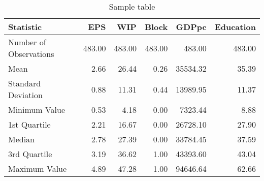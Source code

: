 \documentclass{article}
\begin{document}
\begin{table}
\centering
\begin{tabular}{lrrrrr}
\toprule
             Statistic &    EPS &    WIP &  Block &    GDPpc &  Education \\
\midrule
Number of Observations & 483.00 & 483.00 & 483.00 &   483.00 &     483.00 \\
                  Mean &   2.66 &  26.44 &   0.26 & 35534.32 &      35.39 \\
    Standard Deviation &   0.88 &  11.31 &   0.44 & 13989.95 &      11.37 \\
         Minimum Value &   0.53 &   4.18 &   0.00 &  7323.44 &       8.88 \\
          1st Quartile &   2.21 &  16.67 &   0.00 & 26728.10 &      27.90 \\
                Median &   2.78 &  27.39 &   0.00 & 33784.45 &      37.59 \\
          3rd Quartile &   3.19 &  36.62 &   1.00 & 43393.60 &      43.04 \\
         Maximum Value &   4.89 &  47.28 &   1.00 & 94646.64 &      62.66 \\
\bottomrule
\end{tabular}

\caption{Sample table}
\end{table}
\end{document}
